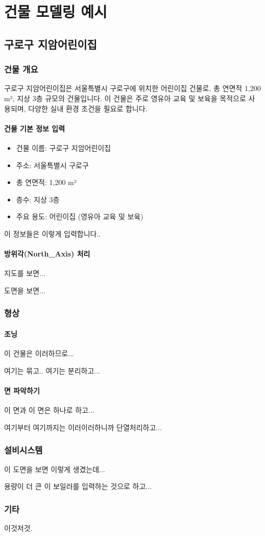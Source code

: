
\part{건물 모델링 예시}

\chapter{구로구 지암어린이집}

\section{건물 개요}
구로구 지암어린이집은 서울특별시 구로구에 위치한 어린이집 건물로, 총 연면적 1,200 m², 지상 3층 규모의 건물입니다. 이 건물은 주로 영유아 교육 및 보육을 목적으로 사용되며, 다양한 실내 환경 조건을 필요로 합니다.

\subsection{건물 기본 정보 입력}

\begin{itemize}
    \item 건물 이름: 구로구 지암어린이집
    \item 주소: 서울특별시 구로구
    \item 총 연면적: 1,200 m²
    \item 층수: 지상 3층
    \item 주요 용도: 어린이집 (영유아 교육 및 보육)
\end{itemize}

이 정보들은 이렇게 입력합니다..

\subsection{방위각(North\_Axis) 처리}

지도를 보면... 

도면을 보면...

\section{형상}

\subsection{조닝}

이 건물은 이러하므로...

여기는 묶고.. 여기는 분리하고...

\subsection{면 파악하기}

이 면과 이 면은 하나로 하고...

여기부터 여기까지는 이러이러하니까 단열처리하고...

\section{설비시스템}

이 도면을 보면 이렇게 생겼는데...

용량이 더 큰 이 보일러를 입력하는 것으로 하고...

\section{기타}

이것저것.